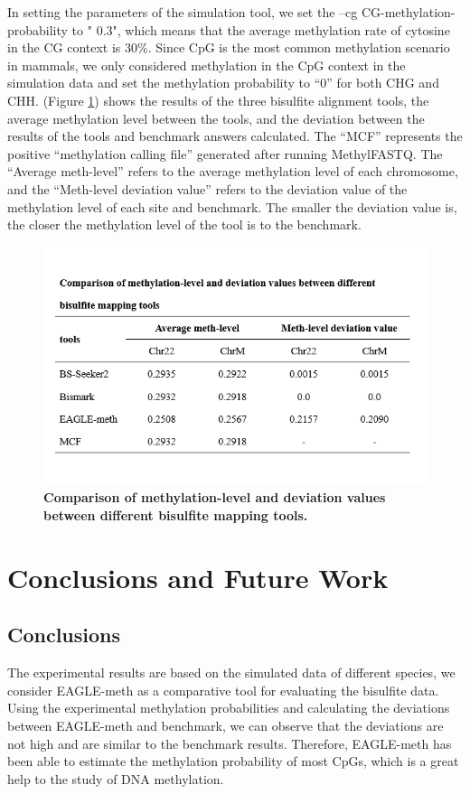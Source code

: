 \documentclass{PHlab-thesis}
\begin{document}
In setting the parameters of the simulation tool, we set the --cg CG-methylation-probability to " 0.3", which means that the average methylation rate of cytosine in the CG context is 30\%. Since CpG is the most common methylation scenario in mammals, we only considered methylation in the CpG context in the simulation data and set the methylation probability to “0” for both CHG and CHH. (Figure \ref{f14}) shows the results of the three bisulfite alignment tools, the average methylation level between the tools, and the deviation between the results of the tools and benchmark answers calculated. The “MCF” represents the positive “methylation calling file” generated after running MethylFASTQ. The “Average meth-level” refers to the average methylation level of each chromosome, and the “Meth-level deviation value” refers to the deviation value of the methylation level of each site and benchmark. The smaller the deviation value is, the closer the methylation level of the tool is to the benchmark.

\begin{figure}[h]
  \centering
  \includegraphics[scale=0.8]{table/table7.png}
  \caption{\textbf{Comparison of methylation-level and deviation values between different bisulfite mapping tools.}}
  \label{f14}
\end{figure}


\chapter{Conclusions and Future Work}

\section{Conclusions}
The experimental results are based on the simulated data of different species, we consider EAGLE-meth as a comparative tool for evaluating the bisulfite data. Using the experimental methylation probabilities and calculating the deviations between EAGLE-meth and benchmark, we can observe that the deviations are not high and are similar to the benchmark results. Therefore, EAGLE-meth has been able to estimate the methylation probability of most CpGs, which is a great help to the study of DNA methylation.
\end{document}
